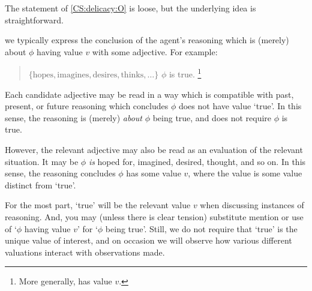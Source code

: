 \begin{note}
  The statement of \ref{CS:delicacy:O} is loose, but the underlying idea is straightforward.

  we typically express the conclusion of the agent's reasoning which is (merely) about \(\phi\) having value \(v\) with some adjective.
  For example:

  \begin{quote}
    \vAgent{} \(\{ \text{hopes}, \text{imagines}, \text{desires}, \text{thinks}, \dots \}\) \(\phi\) is true.%
    \footnote{
      More generally, has value \(v\).
    }
  \end{quote}
  Each candidate adjective may be read in a way which is compatible with past, present, or future reasoning which concludes \(\phi\) does not have value `true'.
  In this sense, the reasoning is (merely) \emph{about} \(\phi\) being true, and does not require \(\phi\) is true.

  However, the relevant adjective may also be read as an evaluation of the relevant situation.
  It may be \(\phi\) \emph{is} hoped for, imagined, desired, thought, and so on.
  In this sense, the reasoning concludes \(\phi\) has some value \(v\), where the value is some value distinct from `true'.

  For the most part, `true' will be the relevant value \(v\) when discussing instances of reasoning.
  And, you may (unless there is clear tension) substitute mention or use of `\(\phi\) having value \(v\)' for `\(\phi\) being true'.
  Still, we do not require that `true' is the unique value of interest, and on occasion we will observe how various different valuations interact with observations made.
\end{note}

